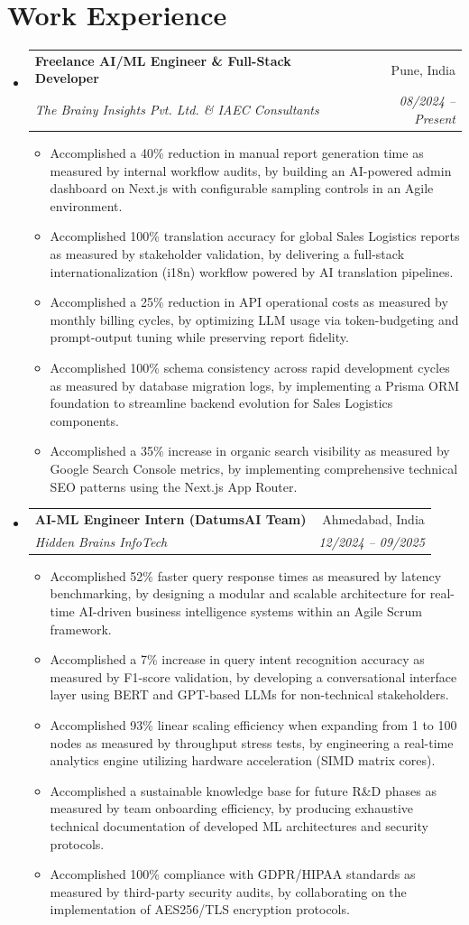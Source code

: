 \documentclass[a4paper,10pt]{article}
\makeatletter
\newcommand{\resumeItem}[1]{
  \item\small{#1}
}
\newcommand{\resumeItemListStart}{\begin{itemize}[leftmargin=0.2in]}
\newcommand{\resumeItemListEnd}{\end{itemize}\vspace{-5pt}}
\newcommand{\resumeSubheading}[4]{
  \vspace{-1pt}\item
    \begin{tabular*}{0.97\textwidth}[t]{l@{\extracolsep{\fill}}r}
      \textbf{#1} & #2 \\
      \textit{\small#3} & \textit{\small #4} \\
    \end{tabular*}\vspace{-5pt}
}
\makeatother
\begin{document}
\section{Work Experience}
\begin{itemize}[leftmargin=0.15in, label={}]
    \resumeSubheading
      {Freelance AI/ML Engineer \& Full-Stack Developer}{Pune, India}
      {The Brainy Insights Pvt. Ltd. \& IAEC Consultants}{08/2024 -- Present}
      \resumeItemListStart
        \resumeItem{Accomplished a 40\% reduction in manual report generation time as measured by internal workflow audits, by building an AI-powered admin dashboard on Next.js with configurable sampling controls in an Agile environment.}
        \resumeItem{Accomplished 100\% translation accuracy for global Sales Logistics reports as measured by stakeholder validation, by delivering a full-stack internationalization (i18n) workflow powered by AI translation pipelines.}
        \resumeItem{Accomplished a 25\% reduction in API operational costs as measured by monthly billing cycles, by optimizing LLM usage via token-budgeting and prompt-output tuning while preserving report fidelity.}
        \resumeItem{Accomplished 100\% schema consistency across rapid development cycles as measured by database migration logs, by implementing a Prisma ORM foundation to streamline backend evolution for Sales Logistics components.}
        \resumeItem{Accomplished a 35\% increase in organic search visibility as measured by Google Search Console metrics, by implementing comprehensive technical SEO patterns using the Next.js App Router.}
      \resumeItemListEnd

    \resumeSubheading
      {AI-ML Engineer Intern (DatumsAI Team)}{Ahmedabad, India}
      {Hidden Brains InfoTech}{12/2024 -- 09/2025}
      \resumeItemListStart
        \resumeItem{Accomplished 52\% faster query response times as measured by latency benchmarking, by designing a modular and scalable architecture for real-time AI-driven business intelligence systems within an Agile Scrum framework.}
        \resumeItem{Accomplished a 7\% increase in query intent recognition accuracy as measured by F1-score validation, by developing a conversational interface layer using BERT and GPT-based LLMs for non-technical stakeholders.}
        \resumeItem{Accomplished 93\% linear scaling efficiency when expanding from 1 to 100 nodes as measured by throughput stress tests, by engineering a real-time analytics engine utilizing hardware acceleration (SIMD matrix cores).}
        \resumeItem{Accomplished a sustainable knowledge base for future R\&D phases as measured by team onboarding efficiency, by producing exhaustive technical documentation of developed ML architectures and security protocols.}
        \resumeItem{Accomplished 100\% compliance with GDPR/HIPAA standards as measured by third-party security audits, by collaborating on the implementation of AES256/TLS encryption protocols.}
      \resumeItemListEnd


\end{itemize}
\end{document}
